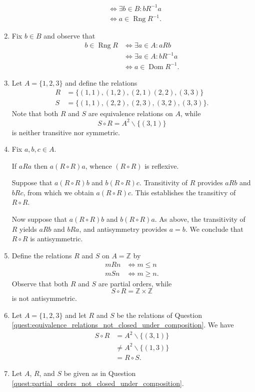 \documentclass{article}
\newcommand{\Z}{\mathbb{Z}}
\DeclareMathOperator{\Dom}{Dom}
\DeclareMathOperator{\Rng}{Rng}
\begin{document}
\begin{enumerate}
\begin{align*}
				&\iff	\exists b\in B : bR^{-1}a	\\
				&\iff	a\in\Rng R^{-1}.
		\end{align*}
	\item Fix $b\in B$ and observe that
		\begin{align*}
			b\in\Rng R
				&\iff	\exists a\in A : aRb		\\
				&\iff	\exists a\in A : bR^{-1}a	\\
				&\iff	a\in\Dom R^{-1}.
		\end{align*}
	\item Let $A=\{1,2,3\}$ and define the relations
		\begin{align*}
			R	&=	\{(1,1),(1,2),(2,1)(2,2),(3,3)\}	\\
			S	&=	\{(1,1),(2,2),(2,3),(3,2),(3,3)\}.
		\end{align*}
		Note that both $R$ and $S$ are equivalence relations on $A$, while
		\[
			S\circ R = A^2\backslash \{(3,1)\}
		\]
		is neither transitive nor symmetric. \label{quest:equivalence_relations_not_closed_under_composition}
	\item Fix $a,b,c\in A$.

		If $aRa$ then $a(R\circ R)a$, whence $(R\circ R)$ is reflexive.

		Suppose that $a(R\circ R)b$ and $b(R\circ R)c$. Transitivity of $R$ provides $aRb$ and $bRc$, from which we obtain $a(R\circ R)c$. This establishes the transitivy of $R\circ R$.

		Now suppose that $a(R\circ R)b$ and $b(R\circ R)a$. As above, the transitivity of $R$ yields $aRb$ and $bRa$, and antisymmetry provides $a=b$. We conclude that $R\circ R$ is antisymmetric.
	\item Define the relations $R$ and $S$ on $A=\Z$ by
		\begin{align*}
			mRn	&\iff	m\leq n		\\
			mSn	&\iff	m\geq n.
		\end{align*}
		Observe that both $R$ and $S$ are partial orders, while
		\[
			S\circ R = \Z\times\Z
		\]
		is not antisymmetric. \label{quest:partial_orders_not_closed_under_composition}
	\item Let $A=\{1,2,3\}$ and let $R$ and $S$ be the relations of Question \ref{quest:equivalence_relations_not_closed_under_composition}. We have
		\begin{align*}
			S\circ R
				&=	A^2\backslash \{(3,1)\}		\\
				&\neq	A^2\backslash \{(1,3)\}		\\
				&=	R\circ S.
		\end{align*}
	\item Let $A$, $R$, and $S$ be given as in Question \ref{quest:partial_orders_not_closed_under_composition}.
\end{enumerate}
\end{document}
